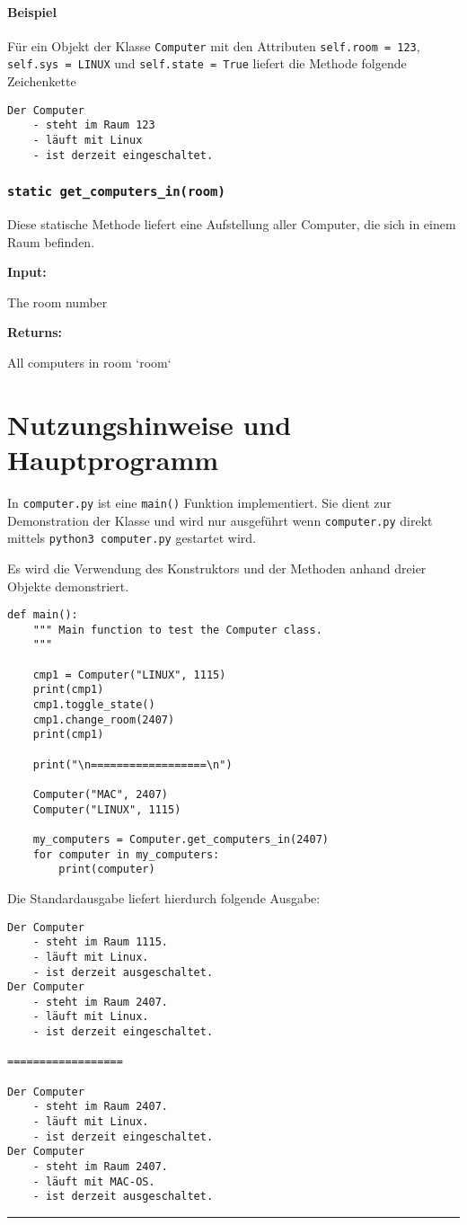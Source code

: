 \documentclass[smallheadings]{scrartcl}
\newcommand{\initem}[2]{\item[\hspace{0.5em} {\normalfont\ttfamily{#1}} {\normalfont\itshape{(#2)}}]}
\newcommand{\outitem}[1]{\item[\hspace{0.5em} \normalfont\itshape{(#1)}]}
\newcommand{\bfpara}[1]{
	
	\noindent \textbf{#1:}\,}
\begin{document}
\paragraph{Beispiel} F\"ur ein Objekt der Klasse \texttt{Computer} mit den Attributen 
\texttt{self.room = 123}, \texttt{self.sys = LINUX} und \texttt{self.state = True} liefert die Methode
folgende Zeichenkette
\begin{verbatim} 
Der Computer
    - steht im Raum 123
    - läuft mit Linux
    - ist derzeit eingeschaltet.
\end{verbatim}

\subsubsection{\texttt{static get\_computers\_in(room)}}
Diese statische Methode liefert eine Aufstellung aller Computer, die sich in einem Raum befinden.

\bfpara{Input}
      \begin{compactdesc}
	      \initem{room}{int} The room number
	\end{compactdesc}
\bfpara{Returns}
          \begin{compactdesc}
		  \outitem{list of computers} All computers in room `room`
	  \end{compactdesc}


\section{Nutzungshinweise und Hauptprogramm}
In \texttt{computer.py} ist eine \texttt{main()} Funktion implementiert. Sie dient zur Demonstration der Klasse und wird nur ausgef\"uhrt wenn \texttt{computer.py} direkt mittels \texttt{python3 computer.py} gestartet wird. 

Es wird die Verwendung des Konstruktors und der Methoden anhand dreier Objekte demonstriert.
\begin{lstlisting}
def main():
    """ Main function to test the Computer class.
    """

    cmp1 = Computer("LINUX", 1115)
    print(cmp1)
    cmp1.toggle_state()
    cmp1.change_room(2407)
    print(cmp1)

    print("\n==================\n")

    Computer("MAC", 2407)
    Computer("LINUX", 1115)

    my_computers = Computer.get_computers_in(2407)
    for computer in my_computers:
        print(computer)
\end{lstlisting}
	Die Standardausgabe liefert hierdurch folgende Ausgabe:
\begin{verbatim}
Der Computer
	- steht im Raum 1115.
	- läuft mit Linux.
	- ist derzeit ausgeschaltet.
Der Computer
	- steht im Raum 2407.
	- läuft mit Linux.
	- ist derzeit eingeschaltet.

==================

Der Computer
	- steht im Raum 2407.
	- läuft mit Linux.
	- ist derzeit eingeschaltet.
Der Computer
	- steht im Raum 2407.
	- läuft mit MAC-OS.
	- ist derzeit ausgeschaltet.
\end{verbatim}
\hfill
\hrule
\smallskip
\end{document}
